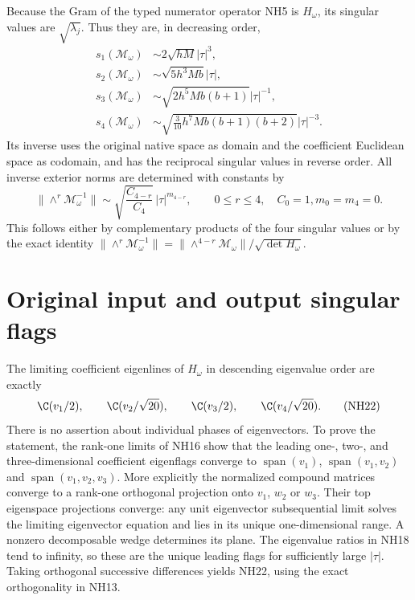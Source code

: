 Because the Gram of the typed numerator operator NH5 is
$H_\omega$, its singular values are $\sqrt{\lambda_j}$.
Thus they are, in decreasing order,
\[
\boxed{\begin{aligned}
 s_1(\mathcal M_\omega)&\sim2\sqrt{hM}|\tau|^3,\\
 s_2(\mathcal M_\omega)&\sim\sqrt{5h^3Mb}|\tau|,\\
 s_3(\mathcal M_\omega)&\sim\sqrt{2h^5Mb(b+1)}|\tau|^{-1},\\
 s_4(\mathcal M_\omega)&\sim\sqrt{\tfrac3{10}h^7Mb(b+1)(b+2)}|\tau|^{-3}.
\end{aligned}}\tag{NH20}
\]
Its inverse uses the original native space as domain and the
coefficient Euclidean space as codomain, and has the reciprocal
singular values in reverse order. All inverse exterior norms
are determined with constants by
\[
 \|\wedge^r\mathcal M_\omega^{-1}\|
 \sim\sqrt{\frac{C_{4-r}}{C_4}}\,
            |\tau|^{m_{4-r}},\qquad 0\le r\le4,
 \quad C_0=1, m_0=m_4=0.
 \tag{NH21}
\]
This follows either by complementary products of the four
singular values or by the exact identity
$\|\wedge^r\mathcal M_\omega^{-1}\|
=\|\wedge^{4-r}\mathcal M_\omega\|/\sqrt{\det H_\omega}$.

\section{Original input and output singular flags}
The limiting coefficient eigenlines of $H_\omega$ in descending
eigenvalue order are exactly
\[
 \C(v_1/2),\qquad\C(v_2/\sqrt{20}),\qquad
 \C(v_3/2),\qquad\C(v_4/\sqrt{20}).
 \tag{NH22}
\]
There is no assertion about individual phases of eigenvectors.
To prove the statement, the rank-one limits of NH16 show that
the leading one-, two-, and three-dimensional coefficient
eigenflags converge to
$\operatorname{span}(v_1)$, $\operatorname{span}(v_1,v_2)$ and
$\operatorname{span}(v_1,v_2,v_3)$. More explicitly the normalized compound
matrices converge to a rank-one orthogonal projection onto
$v_1$, $w_2$ or $w_3$. Their top eigenspace projections converge:
any unit eigenvector subsequential limit solves the limiting
eigenvector equation and lies in its unique one-dimensional
range. A nonzero decomposable wedge determines its plane.
The eigenvalue ratios in NH18 tend to infinity, so these are
the unique leading flags for sufficiently large $|\tau|$.
Taking orthogonal successive differences yields NH22, using
the exact orthogonality in NH13.

